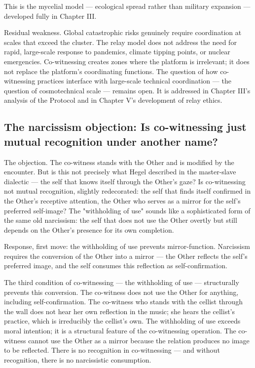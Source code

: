 This is the mycelial model — ecological spread rather than military expansion — developed fully in Chapter III.

Residual weakness. Global catastrophic risks genuinely require coordination at scales that exceed the cluster. The relay model does not address the need for rapid, large-scale response to pandemics, climate tipping points, or nuclear emergencies. Co-witnessing creates zones where the platform is irrelevant; it does not replace the platform's coordinating functions. The question of how co-witnessing practices interface with large-scale technical coordination — the question of cosmotechnical scale — remains open. It is addressed in Chapter III's analysis of the  Protocol and in Chapter V's development of relay ethics.

\subsection{The narcissism objection: Is co-witnessing just mutual recognition under another name?}

The objection. The co-witness stands with the Other and is modified by the encounter. But is this not precisely what Hegel described in the master-slave dialectic — the self that knows itself through the Other's gaze? Is co-witnessing not mutual recognition, slightly redecorated: the self that finds itself confirmed in the Other's receptive attention, the Other who serves as a mirror for the self's preferred self-image? The "withholding of use" sounds like a sophisticated form of the same old narcissism: the self that does not use the Other overtly but still depends on the Other's presence for its own completion.

Response, first move: the withholding of use prevents mirror-function. Narcissism requires the conversion of the Other into a mirror — the Other reflects the self's preferred image, and the self consumes this reflection as self-confirmation.

The third condition of co-witnessing — the withholding of use — structurally prevents this conversion. The co-witness does not use the Other for anything, including self-confirmation. The co-witness who stands with the cellist through the wall does not hear her own reflection in the music; she hears the cellist's practice, which is irreducibly the cellist's own. The withholding of use exceeds moral intention; it is a structural feature of the co-witnessing operation. The co-witness cannot use the Other as a mirror because the relation produces no image to be reflected. There is no recognition in co-witnessing — and without recognition, there is no narcissistic consumption.

